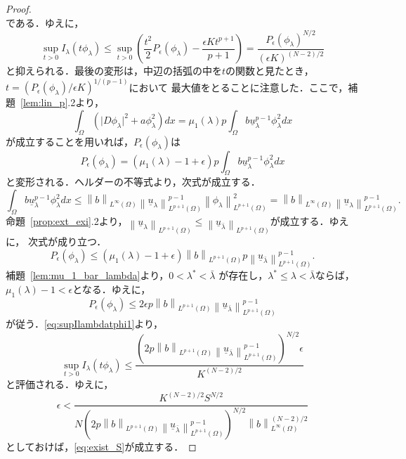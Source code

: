 \begin{proof}
\[ \]
 である．ゆえに，
\begin{equation}
 \sup_{t > 0} I_\lambda (t \phi_\lambda) \leq \sup_{t > 0} \left(
                                                            \frac{t^2}{2} P_\epsilon 
 (\phi_\lambda) - \frac{\epsilon K t^{p+1}}{p+1} \right) =  
 \frac{P_\epsilon(\phi_\lambda)^{N/2}}{\left( \epsilon K
                                         \right)^{(N-2)/2}}
 \label{eq:supIlambdatphi1} 
\end{equation}
と抑えられる．最後の変形は，中辺の括弧の中を$t$の関数と見たとき，
$t = ( P_\epsilon(\phi_\lambda) / \epsilon K )^{1/(p-1)}$において
最大値をとることに注意した．ここで，補題~\ref{lem:lin_p}.2より，
\[
 \int_\Omega \left( \lvert D\phi_\lambda \rvert^2 + a \phi_\lambda^2
 \right) dx = \mu_1(\lambda) p \int_\Omega b
 \underline{u}_\lambda^{p-1} \phi_\lambda^2 dx
\]
が成立することを用いれば，$P_\epsilon(\phi_\lambda)$は
\[
 P_\epsilon(\phi_\lambda) = \left( \mu_1(\lambda) - 1 + \epsilon
 \right) p \int_\Omega b \underline{u}_\lambda^{p-1} \phi_\lambda^2 dx
\]
と変形される．ヘルダーの不等式より，次式が成立する．
\[
 \int_\Omega b \underline{u}_\lambda^{p-1} \phi_\lambda^2 dx \leq
 \left\| b \right\|_{L^\infty(\Omega)} \left\| \underline{u}_\lambda
 \right\|_{L^{p+1}(\Omega)}^{p-1} \left\| \phi_\lambda
 \right\|_{L^{p+1}(\Omega)}^2 = \left\| b \right\|_{L^\infty(\Omega)}
 \left\| \underline{u}_\lambda 
 \right\|_{L^{p+1}(\Omega)}^{p-1}.
\]
命題~\ref{prop:ext_exi}.2より，$\left\| \underline{u}_\lambda 
 \right\|_{L^{p+1}(\Omega)} \leq \left\| \underline{u}_{\bar{\lambda}} 
 \right\|_{L^{p+1}(\Omega)}$が成立する．ゆえに，
次式が成り立つ．
\[
 P_\epsilon(\phi_\lambda) \leq (\mu_1(\lambda) - 1 + \epsilon) \left\|
 b \right\|_{L^{p+1}(\Omega)} p \left\| \underline{u}_{\bar{\lambda}}
 \right\|_{L^{p+1}(\Omega)}^{p-1}.
\]
補題~\ref{lem:mu_1_bar_lambda}より，$0 < \lambda^{*} < \bar{\lambda}$
が存在し，$\lambda^{*} \leq \lambda < \bar{\lambda}$ならば，
$\mu_1(\lambda) - 1 < \epsilon$となる．ゆえに，
\[
 P_\epsilon(\phi_\lambda) \leq 2\epsilon p \left\|
 b \right\|_{L^{p+1}(\Omega)} \left\| \underline{u}_{\bar{\lambda}}
 \right\|_{L^{p+1}(\Omega)}^{p-1}
\]
が従う．\eqref{eq:supIlambdatphi1}より，
\[
 \sup_{t > 0} I_\lambda (t \phi_\lambda) \leq \frac{\left( 2p \left\|
 b \right\|_{L^{p+1}(\Omega)} \left\| \underline{u}_{\bar{\lambda}}
 \right\|_{L^{p+1}(\Omega)}^{p-1} \right)^{N/2} \epsilon}{K^{(N-2)/2}}
\]
と評価される．ゆえに，
\begin{equation}
 \epsilon < \frac{K^{(N-2)/2} S^{N/2}}{N
 \left( 2p \left\|
  b \right\|_{L^{p+1}(\Omega)} \left\| \underline{u}_{\bar{\lambda}}
 \right\|_{L^{p+1}(\Omega)}^{p-1} \right)^{N/2}
  \left\| b
  \right\|_{L^\infty(\Omega)} ^{(N-2)/2}}
 \label{eq:epsilon_gutaiteki}
\end{equation}
としておけば，\eqref{eq:exist_S}が成立する． \qedhere
\end{proof}


